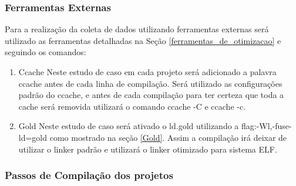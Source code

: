 \subsubsection{Ferramentas Externas}

	Para a realização da coleta de dados utilizando ferramentas
 externas será utilizado as ferramentas detalhadas na Seção 
\ref{ferramentas_de_otimizacao} e seguindo os comandos:

        \begin{enumerate}
               \item Ccache
                    \subitem Neste estudo de caso em cada projeto será adicionado
 a palavra ccache antes de cada linha de compilação. Será utilizado as
 configurações padrão do ccache, e antes de cada compilação para ter certeza
 que toda a cache será removida utilizará o comando ccache -C e ccache -c.
                \item Gold
                    \subitem Neste estudo de caso será ativado o ld.gold
 utilizando a flag:-Wl,-fuse-ld=gold como mostrado na seção \ref{Gold}. Assim  a
 compilação irá deixar de utilizar o linker padrão e utilizará o linker
 otimizado para sistema ELF.
        \end{enumerate}

\subsubsection{Passos de Compilação dos projetos}

